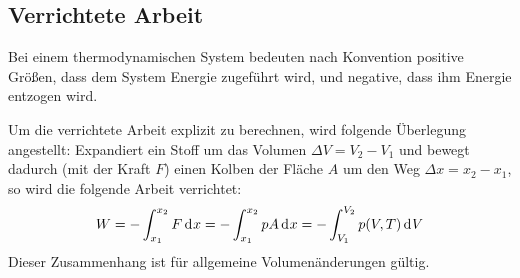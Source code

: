 \subsection{Verrichtete Arbeit}
Bei einem thermodynamischen System bedeuten nach Konvention positive Größen, dass dem System Energie zugeführt wird, und negative, dass ihm Energie entzogen wird.


Um die verrichtete Arbeit explizit zu berechnen, wird folgende Überlegung angestellt: Expandiert ein Stoff um das Volumen $\Delta V = V_2 - V_1$ und bewegt dadurch (mit der Kraft $F$) einen Kolben der Fläche $A$ um den Weg $\Delta x = x_2 - x_1$, so wird die folgende Arbeit verrichtet:
\begin{equation}\label{eq:arbeit_allgemein}
	W = -\int_{x_1}^{x_2} F \diff x
	= -\int_{x_1}^{x_2} p A \diff x
	= -\int_{V_1}^{V_2} p(V, T) \diff V
\end{equation}
Dieser Zusammenhang ist für allgemeine Volumenänderungen gültig.

